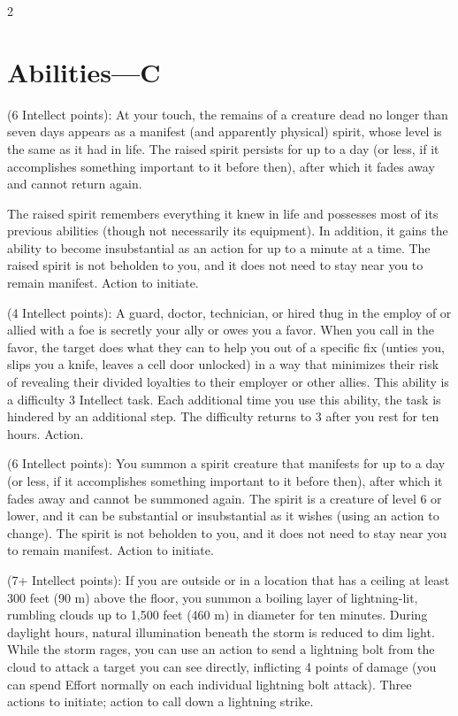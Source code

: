 \begin{multicols}{2}

\section{Abilities—C} %

 (6 Intellect points): At your touch, the remains of a creature dead no longer than seven days appears as a manifest (and apparently physical) spirit, whose level is the same as it had in life. The raised spirit persists for up to a day (or less, if it accomplishes something important to it before then), after which it fades away and cannot return again. 

The raised spirit remembers everything it knew in life and possesses most of its previous abilities (though not necessarily its equipment). In addition, it gains the ability to become insubstantial as an action for up to a minute at a time. The raised spirit is not beholden to you, and it does not need to stay near you to remain manifest. Action to initiate.
 
 (4 Intellect points): A guard, doctor, technician, or hired thug in the employ of or allied with a foe is secretly your ally or owes you a favor. When you call in the favor, the target does what they can to help you out of a specific fix (unties you, slips you a knife, leaves a cell door unlocked) in a way that minimizes their risk of revealing their divided loyalties to their employer or other allies. This ability is a difficulty 3 Intellect task. Each additional time you use this ability, the task is hindered by an additional step. The difficulty returns to 3 after you rest for ten hours. Action. 

 (6 Intellect points): You summon a spirit creature that manifests for up to a day (or less, if it accomplishes something important to it before then), after which it fades away and cannot be summoned again. The spirit is a creature of level 6 or lower, and it can be substantial or insubstantial as it wishes (using an action to change). The spirit is not beholden to you, and it does not need to stay near you to remain manifest. Action to initiate. 

 (7+ Intellect points): If you are outside or in a location that has a ceiling at least 300 feet (90 m) above the floor, you summon a boiling layer of lightning-lit, rumbling clouds up to 1,500 feet (460 m) in diameter for ten minutes. During daylight hours, natural illumination beneath the storm is reduced to dim light. While the storm rages, you can use an action to send a lightning bolt from the cloud to attack a target you can see directly, inflicting 4 points of damage (you can spend Effort normally on each individual lightning bolt attack). Three actions to initiate; action to call down a lightning strike. 


\end{multicols}
